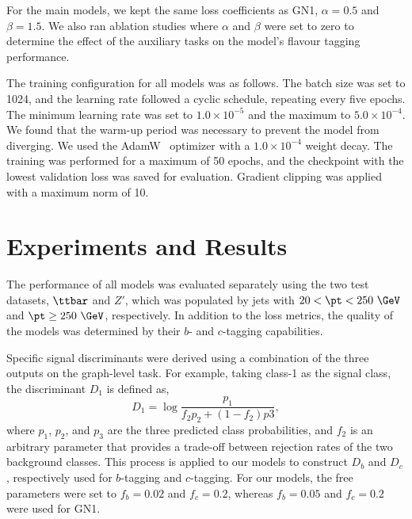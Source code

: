 For the main models, we kept the same loss coefficients as GN1, $\alpha = 0.5$ and $\beta = 1.5$.
We also ran ablation studies where $\alpha$ and $\beta$ were set to zero to determine the effect of the auxiliary tasks on the model's flavour tagging performance.

The training configuration for all models was as follows.
The batch size was set to 1024, and the learning rate followed a cyclic schedule, repeating every five epochs.
The minimum learning rate was set to $1.0 \times 10^{-5}$ and the maximum to $5.0 \times 10^{-4}$.
We found that the warm-up period was necessary to prevent the model from diverging.
We used the AdamW~\cite{AdamW} optimizer with a $1.0 \times 10^{-4}$ weight decay.
The training was performed for a maximum of 50 epochs, and the checkpoint with the lowest validation loss was saved for evaluation.
Gradient clipping was applied with a maximum norm of 10.

\section{Experiments and Results}

The performance of all models was evaluated separately using the two test datasets, $\ttbar$ and $Z'$, which was populated by jets with $20 < \pt < 250~\GeV$ and $\pt \geq 250~\GeV$, respectively.
In addition to the loss metrics, the quality of the models was determined by their $b$- and $c$-tagging capabilities.

Specific signal discriminants were derived using a combination of the three outputs on the graph-level task.
For example, taking class-1 as the signal class, the discriminant $D_1$ is defined as,
\begin{equation}
    D_1 = \log\frac{p_1}{f_2 p_2 + (1-f_2)p3},
\end{equation}
where $p_1$, $p_2$, and $p_3$ are the three predicted class probabilities, and $f_2$ is an arbitrary parameter that provides a trade-off between rejection rates of the two background classes.
This process is applied to our models to construct $D_b$ and $D_c$, respectively used for $b$-tagging and $c$-tagging.
For our models, the free parameters were set to $f_b=0.02$ and $f_c=0.2$, whereas $f_b=0.05$ and $f_c=0.2$ were used for GN1.

